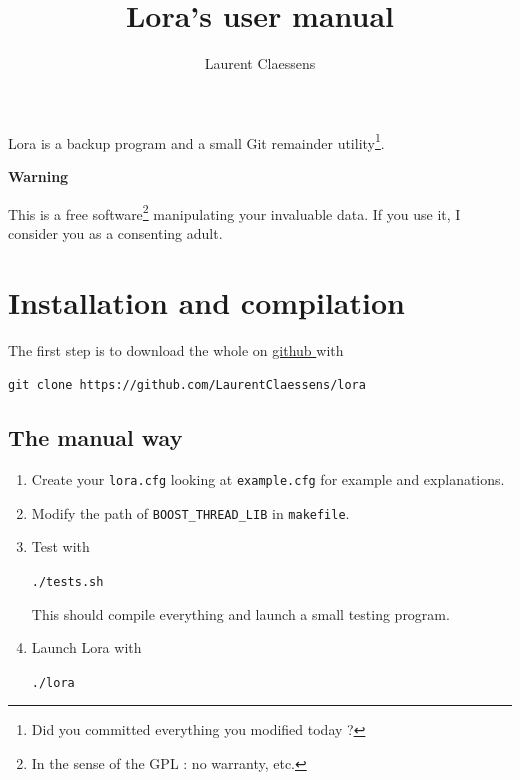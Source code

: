 \documentclass[a4paper,12pt]{article}
\newcommand{\info}[1]{\texttt{#1}}
\begin{document}
\title{Lora's user manual}
\author{Laurent Claessens}
\maketitle

Lora is a backup program and a small Git remainder utility\footnote{Did you committed everything you modified today ?}.

\begin{center}
    {\bf Warning}
\end{center}
This is a free software\footnote{In the sense of the GPL : no warranty, etc.} manipulating your invaluable data. If you use it, I consider you as a consenting adult.

\tableofcontents

\section{Installation and compilation}

The first step is to download the whole on \href{ https://github.com/LaurentClaessens/lora  }{ github } with
\begin{center}
    \info{git clone https://github.com/LaurentClaessens/lora}
\end{center}


\subsection{The manual way}

\begin{enumerate}
    \item
        Create your \info{lora.cfg} looking at \info{example.cfg} for example and explanations.
    \item
        Modify the path of \info{BOOST\_THREAD\_LIB} in \info{makefile}.
    \item
        Test with
        \begin{center}
            \info{./tests.sh}
        \end{center}
        This should compile everything and launch a small testing program.
    \item
        Launch Lora with
        \begin{center}
            \info{./lora}
        \end{center}
\end{enumerate}
\end{document}
